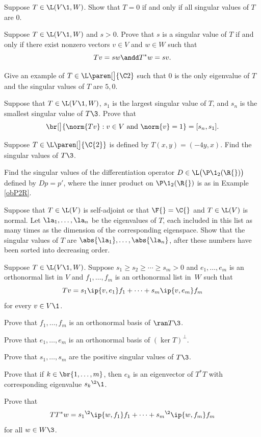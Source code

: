 
\exercise
Suppose $T \in \L(V\1, W)$. Show that $T = 0$ if and only if all singular values of $T$ are $0$.


\exercise
Suppose $T \in \L(V\1, W)$ and $s > 0$. Prove that $s$ is a singular value of $T$ if and only if there exist nonzero vectors $v \in V$ and
$w \in W$ such that \label{2Schmidt}
\[
Tv = sw \andd T^* w = sv.
\]
\exercisedisplayend
{}


\exercise
Give an example of $T \in \L\paren[\big]{\C2}$ such that $0$ is the only eigenvalue of $T$ and the singular values of $T$ are $5, 0$.


\exercise
Suppose that $T \in \L(V\1, W)$, $s_1$ is the largest singular value of $T$, and $s_n$ is the smallest singular value of $T\3$. Prove that\label{3interval}
\[
\br[\big]{ \norm{Tv} : v \in V \text{ and } \norm{v} = 1 } = [s_n, s_1].
\]
\exercisedisplayend


\exercise
Suppose $T \in \L\paren[\big]{\C{2}}$ is defined by $T(x, y) = (-4y, x)$. Find the singular values of $T\3$.


\exercise
Find the singular values of the differentiation operator $D \in \L\bigl(\P\1_2(\R{})\bigr)$ defined by $Dp = p'\!$, where the inner product on $\P\1_2(\R{})$ is as in Example \ref{obP2R}.


\exercise
Suppose that $T \in \L(V)$ is self-adjoint or that $\F{}= \C{}$ and $T \in \L(V)$ is normal. Let $\la_1, \ldots, \la_n$ be the eigenvalues of $T$, each included in this list as many times as the dimension of the corresponding eigenspace. Show that the singular values of $T$ are
$\abs{\la_1}, \ldots, \abs{\la_n}$, after these numbers have been sorted into decreasing order.\label{7singsp}


\exercise
Suppose $T \in \L(V\1, W)$. Suppose $s_1 \ge  s_2 \ge \cdots \ge s_m >0$ and
$e_1, \dots, e_m$ is an orthonormal list in $V$ and $f_1, \dots, f_m$ is an orthonormal list in~$W$ such that \label{4SVD}
\[
Tv = s_1 \ip{v, e_1} f_1 + \dots + s_m \ip{v, e_m} f_m
\]
for every $v \in V\1$.
\begin{subtheorem}
\item
Prove that $f_1, \dots, f_m$ is an orthonormal basis of $\ran T\3$.
\item
Prove that $e_1, \dots, e_m$  is an orthonormal basis of $(\ker T)^\perp$.
\item
Prove that $s_1, \ldots, s_m$ are the positive singular values of $T\3$.
\item
Prove that if $k \in \br{1, \ldots, m}$, then $e_k$ is an eigenvector of $T^*T$ with corresponding eigenvalue ${s_k}^{\2}\1$.
\item
Prove that
\[
TT^*w = {s_1}^{\2} \ip{w, f_1} f_1 + \cdots + {s_m}^{\2} \ip{w, f_m} f_m
\]
for all $w \in W\3$.
\end{subtheorem}
\exercisesubtheoremend


